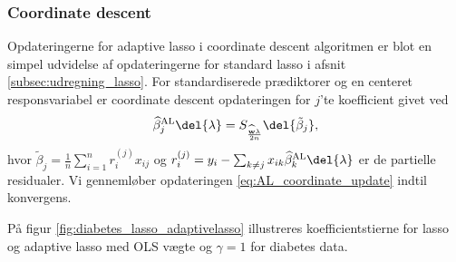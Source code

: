 \subsubsection{Coordinate descent}
Opdateringerne for adaptive lasso i coordinate descent algoritmen er blot en simpel udvidelse af opdateringerne for standard lasso i afsnit \ref{subsec:udregning_lasso}.
For standardiserede prædiktorer og en centeret responsvariabel er coordinate descent opdateringen for $j$'te koefficient givet ved
\begin{align}
\widehat{\beta}^\text{AL}_j \del{\lambda}= S_{\frac{\widehat{\mathbf{w}} \lambda}{2n}} \del{\tilde{\beta}_j}, \label{eq:AL_coordinate_update}
\end{align}
hvor \(\tilde{\beta}_j = \frac{1}{n} \sum_{i=1}^n r_{i}^{(j)} x_{ij}\) og \(r_{i}^{(j)} = y_i - \sum_{k \neq j} x_{ik} \widehat{\beta}^\text{AL}_k \del{\lambda}\) er de partielle residualer.
Vi gennemløber opdateringen \eqref{eq:AL_coordinate_update} indtil konvergens.
\newpage
\begin{eks}
På figur \ref{fig:diabetes_lasso_adaptivelasso} illustreres koefficientstierne for lasso og adaptive lasso med OLS vægte og \(\gamma = 1\) for diabetes data.

\end{eks}

